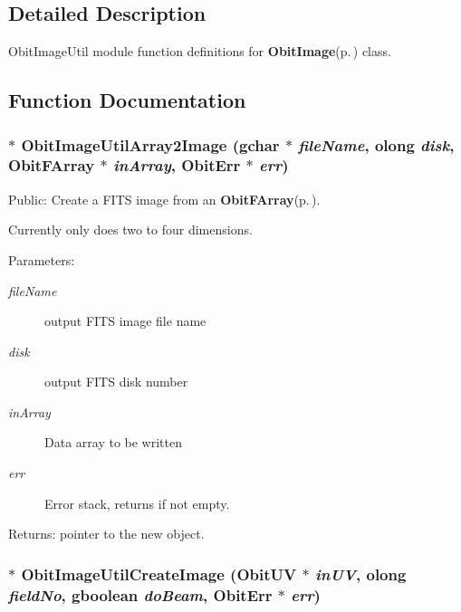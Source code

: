 \subsection{Detailed Description}
Obit\-Image\-Util module function definitions for {\bf Obit\-Image}{\rm (p.\,\pageref{structObitImage})} class. 



\subsection{Function Documentation}
\subsubsection{$\ast$ Obit\-Image\-Util\-Array2Image (gchar $\ast$ {\em file\-Name}, {\bf olong} {\em disk}, {\bf Obit\-FArray} $\ast$ {\em in\-Array}, {\bf Obit\-Err} $\ast$ {\em err})}\label{ObitImageUtil_8c_a16}


Public: Create a FITS image from an {\bf Obit\-FArray}{\rm (p.\,\pageref{structObitFArray})}. 

Currently only does two to four dimensions. \begin{Desc}
\item[Parameters:]
\begin{description}
\item[{\em file\-Name}]output FITS image file name \item[{\em disk}]output FITS disk number \item[{\em in\-Array}]Data array to be written \item[{\em err}]Error stack, returns if not empty. \end{description}
\end{Desc}
\begin{Desc}
\item[Returns:]pointer to the new object. \end{Desc}
\subsubsection{$\ast$ Obit\-Image\-Util\-Create\-Image ({\bf Obit\-UV} $\ast$ {\em in\-UV}, {\bf olong} {\em field\-No}, gboolean {\em do\-Beam}, {\bf Obit\-Err} $\ast$ {\em err})}\label{ObitImageUtil_8c_a5}


